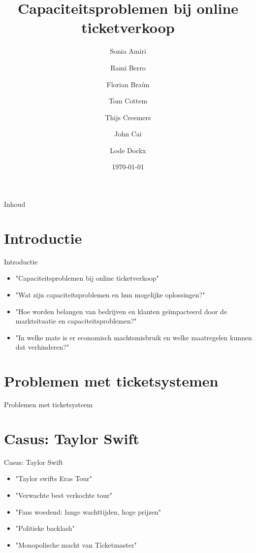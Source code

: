 \documentclass{beamer}
\title{Capaciteitsproblemen bij online ticketverkoop}
\author{Sonia Amiri \and Rami Berro \and Florian Braùn \and Tom Cottem \and Thijs Creemers \and John Cai \and Lode Dockx}
\date{\today}
\begin{document}
\begin{frame}
  \titlepage
\end{frame}

\begin{frame}{Inhoud}
  \tableofcontents
\end{frame}

\section{Introductie}
\begin{frame}{Introductie}
    \begin{itemize}
        \item "Capaciteitsproblemen bij online ticketverkoop"
        \item "Wat zijn capaciteitsproblemen en hun mogelijke oplossingen?"
        \item "Hoe worden belangen van bedrijven en klanten geïmpacteerd door de marktsituatie en capaciteitsproblemen?"
        \item "In welke mate is er economisch machtsmisbruik en welke maatregelen kunnen dat verhinderen?"
    \end{itemize}
\end{frame}

\section{Problemen met ticketsystemen}
\begin{frame}{Problemen met ticketsysteem}
    
\end{frame}

\section{Casus: Taylor Swift} %
\begin{frame}{Casus: Taylor Swift}
    \begin{itemize}
        \item "Taylor swifts Eras Tour"
        \item "Verwachte best verkochte tour"
        \item "Fans woedend: lange wachttijden, hoge prijzen"
        \item "Politieke backlash"
        \item "Monopolische macht van Ticketmaster"
    \end{itemize}
\end{frame}
\end{document}
